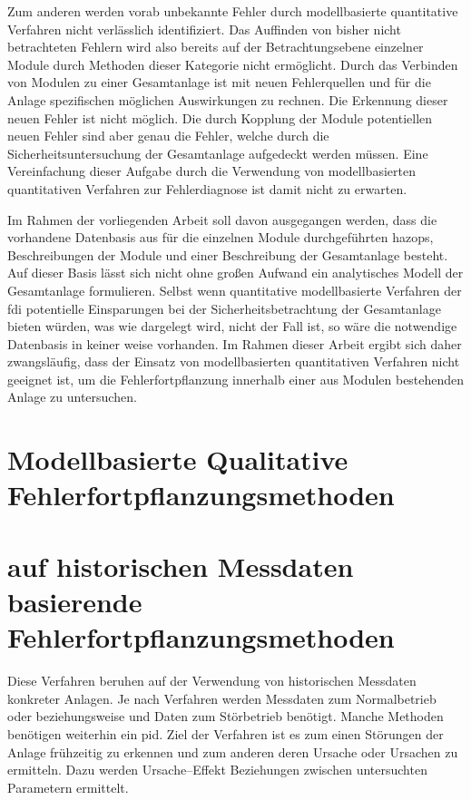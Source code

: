 Zum anderen werden vorab unbekannte Fehler durch modellbasierte quantitative Verfahren nicht verl\"asslich identifiziert. Das Auffinden von bisher nicht betrachteten Fehlern wird also bereits auf der Betrachtungsebene einzelner Module durch Methoden dieser Kategorie nicht erm\"oglicht. Durch das Verbinden von Modulen zu einer Gesamtanlage ist mit neuen Fehlerquellen und f\"ur die Anlage spezifischen m\"oglichen Auswirkungen zu rechnen. Die Erkennung dieser neuen Fehler ist nicht m\"oglich. Die durch Kopplung der Module potentiellen neuen Fehler sind aber genau die Fehler, welche durch die Sicherheitsuntersuchung der Gesamtanlage aufgedeckt werden m\"ussen. Eine Vereinfachung dieser Aufgabe durch die Verwendung von modellbasierten quantitativen Verfahren zur Fehlerdiagnose ist damit nicht zu erwarten. \newline

Im Rahmen der vorliegenden Arbeit soll davon ausgegangen werden, dass die vorhandene Datenbasis aus f\"ur die einzelnen Module durchgef\"uhrten \acp{hazop}, Beschreibungen der Module und einer Beschreibung der Gesamtanlage besteht. Auf dieser Basis l\"asst sich nicht ohne gro\ss{}en Aufwand ein analytisches Modell der Gesamtanlage formulieren. Selbst wenn quantitative modellbasierte Verfahren der \ac{fdi} potentielle Einsparungen bei der Sicherheitsbetrachtung der Gesamtanlage bieten w\"urden, was wie dargelegt wird, nicht der Fall ist, so w\"are die notwendige Datenbasis in keiner weise vorhanden. Im Rahmen dieser Arbeit ergibt sich daher  zwangsl\"aufig, dass der Einsatz von modellbasierten quantitativen Verfahren nicht geeignet ist, um die Fehlerfortpflanzung innerhalb einer aus Modulen bestehenden Anlage zu untersuchen. 
\section{Modellbasierte Qualitative  Fehlerfortpflanzungsmethoden}\label{sec:fAna_modQual}


\section{auf historischen Messdaten basierende Fehlerfortpflanzungsmethoden}\label{sec:fAna_dat}
Diese Verfahren beruhen auf der Verwendung von historischen Messdaten konkreter Anlagen. Je nach Verfahren werden Messdaten zum Normalbetrieb oder beziehungsweise und Daten zum St\"orbetrieb ben\"otigt. Manche Methoden ben\"otigen weiterhin ein \ac{pid}. Ziel der Verfahren ist es zum einen St\"orungen der Anlage fr\"uhzeitig zu erkennen und zum anderen deren Ursache oder Ursachen zu ermitteln. Dazu werden Ursache--Effekt Beziehungen zwischen untersuchten Parametern ermittelt.  

